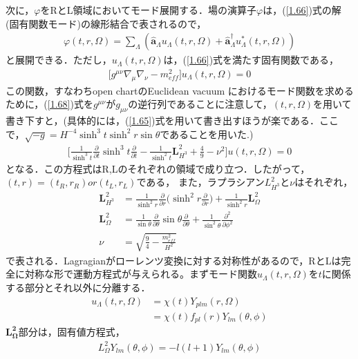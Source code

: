 次に，$\varphi$をRとL領域においてモード展開する．場の演算子$\varphi$は，(\ref{1.66})式の解(固有関数モード)の線形結合で表されるので，
\begin{align}
  \varphi(t,r,\Omega)=\sum_{\Lambda}(\hat{\bm{a}}_{\Lambda}u_{\Lambda}(t,r,\Omega)+\hat{\bm{a}}^{\dagger}_{\Lambda}u^{*}_{\Lambda}(t,r,\Omega))
\end{align}
と展開できる．ただし，$u_{\Lambda}(t,r,\Omega)$は，(\ref{1.66})式を満たす固有関数である，
\begin{align}
  \label{1.68}
\biggl[g^{\mu\nu}\nabla_{\mu}\nabla_{\nu}-m_{eff}^2\biggr]u_{\Lambda}(t,r,\Omega)=0
\end{align}
この関数，すなわちopen chartのEuclidean vacuum におけるモード関数を求めるために，(\ref{1.68})式を$g^{\mu\nu}$が$g_{\mu\nu}$の逆行列であることに注意して，$(t,r,\Omega)$を用いて書き下すと，(具体的には，(\ref{1.65})式を用いて書き出すほうが楽である．ここで，$\sqrt{-g}=H^{-4}\sinh^3t\sinh^2r\sin\theta$であることを用いた.)
\begin{align}
  \biggl[\frac{1}{\sinh^3t}\frac{\partial}{\partial t}\sinh^3t\frac{\partial}{\partial t}-\frac{1}{\sinh^2t}\bm{L}^2_{H^3}+\frac{4}{9}-\nu^2\biggr]u(t,r,\Omega)=0
\end{align}
となる．この方程式はR,Lのそれぞれの領域で成り立つ．したがって，$(t,r)=(t_{R},r_{R}) or (t_{L},r_{L})$である，
また，ラプラシアン$L_{H^3}^2$と$\nu$はそれぞれ，
\begin{align}
  \bm{L}_{H^3}^2&=\frac{1}{\sinh^2r}\frac{\partial}{\partial r}\biggl(\sinh^2r\frac{\partial}{\partial r}\biggr)+\frac{1}{\sinh^2r}\bm{L}_{\Omega}^2 \\
  \bm{L}_{\Omega}^2&=\frac{1}{\sin\theta}\frac{\partial}{\partial \theta}\sin{\theta}\frac{\partial}{\partial \theta}+\frac{1}{\sin^2{\theta}}
  \frac{\partial^2}{\partial \phi^2} \\
  \nu&=\sqrt{\frac{9}{4}-\frac{m^2_{eff}}{H^{2}}}
\end{align}
で表される．Lagragianがローレンツ変換に対する対称性があるので，RとLは完全に対称な形で運動方程式が与えられる。まずモード関数$u_{\Lambda}(t,r,\Omega)$を$t$に関係する部分とそれ以外に分離する．
\begin{align}
  u_{\Lambda}(t,r,\Omega)&=\chi(t)Y_{plm}(r,\Omega)\\
  &=\chi(t)f_{pl}(r)Y_{lm}(\theta,\phi)
 \end{align}
 $\bm{L_{\Omega}^2}$部分は，固有値方程式，
\begin{align}
  L_{\Omega}^2Y_{lm}(\theta,\phi)=-l(l+1)Y_{lm}(\theta,\phi)
\end{align}
